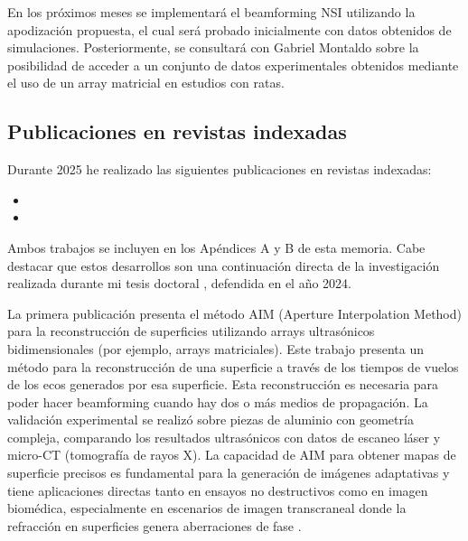 \documentclass[10pt,a4paper]{article}
\begin{document}
En los próximos meses se implementará el beamforming NSI utilizando la apodización propuesta, el cual será probado inicialmente con datos obtenidos de simulaciones. Posteriormente, se consultará con Gabriel Montaldo sobre la posibilidad de acceder a un conjunto de datos experimentales obtenidos mediante el uso de un array matricial en estudios con ratas.

\FloatBarrier %

\subsection{Publicaciones en revistas indexadas}\label{sec:publicaciones}

Durante 2025 he realizado las siguientes publicaciones en revistas indexadas:

\begin{itemize}
	\item {}
	\item {}
\end{itemize}

Ambos trabajos se incluyen en los Apéndices A y B de esta memoria. Cabe destacar que estos desarrollos son una continuación directa de la investigación realizada durante mi tesis doctoral \cite{Cosarinsky2024_tesis}, defendida en el año 2024.

La primera publicación \cite{Cosarinsky2025} presenta el método AIM (Aperture Interpolation Method) para la reconstrucción de superficies utilizando arrays ultrasónicos bidimensionales (por ejemplo, arrays matriciales). Este trabajo presenta un método para la reconstrucción de una superficie a través de los tiempos de vuelos de los ecos generados por esa superficie. Esta reconstrucción es necesaria para poder hacer beamforming cuando hay dos o más medios de propagación. La validación experimental se realizó sobre piezas de aluminio con geometría compleja, comparando los resultados ultrasónicos con datos de escaneo láser y micro-CT (tomografía de rayos X). La capacidad de AIM para obtener mapas de superficie precisos es fundamental para la generación de imágenes adaptativas y tiene aplicaciones directas tanto en ensayos no destructivos como en imagen biomédica, especialmente en escenarios de imagen transcraneal donde la refracción en superficies genera aberraciones de fase \cite{Mozaf2022, Waasdorp2025}.
\end{document}
